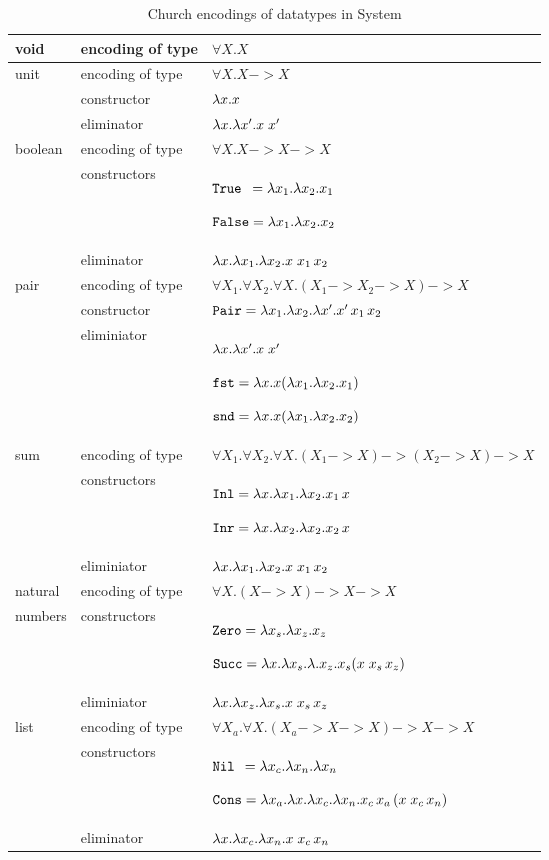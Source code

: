 \begin{table}
\begin{tabular}{p{17mm}|l p{80mm}}
	\hline
void
& encoding of type	& $\forall X.X$
	\\\hline
unit
& encoding of type	& $\forall X.X -> X$	\\
& constructor		& $\lambda x.x$ \\
& eliminator		& $\lambda x.\lambda x'.x\;x'$
	\\\hline
boolean
& encoding of type	& $\forall X.X -> X -> X$ \\
& constructors		& $\mathtt{True}\,\,\, = \lambda x_1.\lambda x_2. x_1$ \par
			$\mathtt{False} = \lambda x_1.\lambda x_2. x_2$ \\
& eliminator		& $\lambda x.\lambda x_1. \lambda x_2. x\;x_1\,x_2$  %
	\\\hline
pair
& encoding of type	& $\forall X_1.\forall X_2.\forall X. (X_1 -> X_2 -> X) -> X$ \\
& constructor		& $\mathtt{Pair} = \lambda x_1.\lambda x_2.\lambda x'.x'\,x_1\,x_2$ \\
& eliminiator		& $\lambda x.\lambda x'.x\;x'$ \par
			$\mathtt{fst} = \lambda x.x(\lambda x_1.\lambda x_2.x_1)$ \par
			$\mathtt{snd} = \lambda x.x(\lambda x_1.\lambda x_2.x_2)$
	\\\hline
sum
& encoding of type	& $\forall X_1.\forall X_2.\forall X. (X_1 -> X) -> (X_2 -> X) -> X$\\
& constructors		& $\mathtt{Inl} = \lambda x. \lambda x_1. \lambda x_2 . x_1\,x$ \par
			$\mathtt{Inr} = \lambda x. \lambda x_2. \lambda x_2 . x_2\,x$ \\
& eliminiator		& $\lambda x.\lambda x_1. \lambda x_2. x\;x_1\,x_2$ %
	\\\hline
natural
& encoding of type	& $\forall X. (X -> X) -> X -> X$ \\
numbers
& constructors		& $\mathtt{Zero} = \lambda x_s. \lambda x_z. x_z$ \par
			$\mathtt{Succ} = \lambda x. \lambda x_s. \lambda. x_z. x_s (x\;x_s\,x_z)$ \\
& eliminiator		& $\lambda x.\lambda x_z. \lambda x_s.x\;x_s\,x_z$
	\\\hline
list
& encoding of type	& $\forall X_a.\forall X. (X_a -> X -> X) -> X -> X$ \\
& constructors		& $\mathtt{Nil}\;\, = \lambda x_c.\lambda x_n.\lambda x_n$ \par
			$\mathtt{Cons} = \lambda x_a.\lambda x.\lambda x_c.\lambda x_n. x_c\,x_a\,(x\;x_c\,x_n)$ \\
& eliminator		& $\lambda x.\lambda x_c. \lambda x_n.x\;x_c\,x_n$
	\\\hline
\end{tabular}
\caption{Church encodings of datatypes in System \F}
\label{tbl:encodingF}
\end{table}

